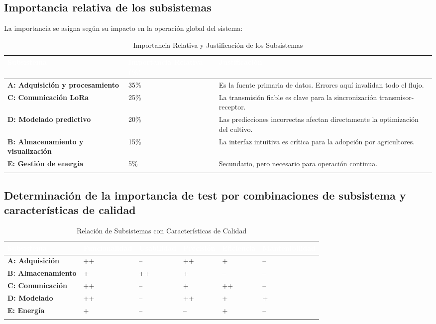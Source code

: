 \documentclass[12pt,a4paper, twosite]{article}
\begin{document}
\subsection{Importancia relativa de los subsistemas }
La importancia se asigna según su impacto en la operación global del sistema:
\begin{longtable}{|p{6cm}|p{2.5cm}|p{6cm}|}
  \hline
  \cellcolor[HTML]{4472C4}\textcolor{white}{\textbf{Subsistema}} & \cellcolor[HTML]{4472C4}\textcolor{white}{\textbf{Importancia Relativa (\%)}} & \cellcolor[HTML]{4472C4}\textcolor{white}{\textbf{Justificación}} \\ \hline
  \textbf{A: Adquisición y procesamiento} & 35\% & Es la fuente primaria de datos. Errores aquí invalidan todo el flujo. \\ \hline
  \textbf{C: Comunicación LoRa} & 25\% & La transmisión fiable es clave para la sincronización transmisor-receptor. \\ \hline
  \textbf{D: Modelado predictivo} & 20\% & Las predicciones incorrectas afectan directamente la optimización del cultivo. \\ \hline
  \textbf{B: Almacenamiento y visualización} & 15\% & La interfaz intuitiva es crítica para la adopción por agricultores. \\ \hline
  \textbf{E: Gestión de energía} & 5\% & Secundario, pero necesario para operación continua. \\ \hline
  \caption{Importancia Relativa y Justificación de los Subsistemas} \label{tab:importancia_justificacion_subsistemas} \\
\end{longtable}

\subsection{Determinación de la importancia de test por combinaciones de subsistema y características de calidad}

\begin{longtable}{|p{5cm}|p{2cm}|p{2cm}|p{2cm}|p{2cm}|p{2cm}|}
  \hline
  \cellcolor[HTML]{4472C4}\textcolor{white}{\textbf{Subsistema}} & \cellcolor[HTML]{4472C4}\textcolor{white}{\textbf{Funcionalidad}} & \cellcolor[HTML]{4472C4}\textcolor{white}{\textbf{Usabilidad}} & \cellcolor[HTML]{4472C4}\textcolor{white}{\textbf{Precisión}} & \cellcolor[HTML]{4472C4}\textcolor{white}{\textbf{Eficiencia}} & \cellcolor[HTML]{4472C4}\textcolor{white}{\textbf{Mantenibilidad}} \\ \hline
  \textbf{A: Adquisición} & ++ & – & ++ & + & – \\ \hline
  \textbf{B: Almacenamiento} & + & ++ & + & – & – \\ \hline
  \textbf{C: Comunicación} & ++ & – & + & ++ & – \\ \hline
  \textbf{D: Modelado} & ++ & – & ++ & + & + \\ \hline
  \textbf{E: Energía} & + & – & – & + & – \\ \hline
  \caption{Relación de Subsistemas con Características de Calidad} \label{tab:subsistemas_caracteristicas_calidad} \\
\end{longtable}
\end{document}
